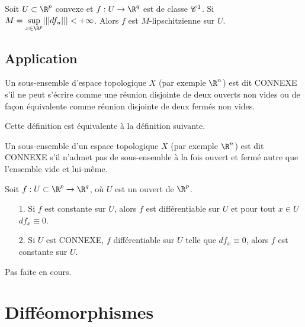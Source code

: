 \documentclass[class=report,crop=false]{standalone}
\begin{document}
\begin{corollaire}
\textcolor[rgb]{0.44,0.00,0.87}{
  Soit $U \subset \R^p$ convexe et $f:U \rightarrow \R^q$ est de classe $\mathscr{C}^1$. Si
$M=\underset{x\in \R^p}{\sup} |||df_u |||<+ \infty$. Alors $f$ est $M$-lipschitzienne sur $U$.}
\end{corollaire}
\section{Application}

\begin{definition}
\textcolor[rgb]{0.98,0.00,0.00}{
  Un sous-ensemble d'espace topologique $X$ (par exemple $\R^n$) est dit CONNEXE s'il ne peut s'\'ecrire comme une r\'eunion disjointe de deux ouverts non vides ou de façon équivalente comme réunion disjointe de deux fermés non vides.}
\end{definition}
\noindent Cette d\'efinition est \'equivalente \`a la d\'efinition suivante.

\begin{definition}
\textcolor[rgb]{0.98,0.00,0.00}{
  Un sous-ensemble d'un espace topologique $X$ (par exemple $\R^n$) est dit CONNEXE s'il n'admet pas de sous-ensemble \`a la fois ouvert et ferm\'e autre que l'ensemble vide et lui-m\^eme.}
\end{definition}

\begin{theoreme}
\textcolor[rgb]{0.44,0.00,0.87}{
  Soit $f: U \subset \R^p \rightarrow \R^q$, o\`u $U$ est un ouvert de $\R^p$.
\begin{itemize}
  \item[1.] Si $f$ est constante sur $U$, alors $f$ est diff\'erentiable sur $U$ et pour tout $x \in U$ $df_x\equiv0$.
  \item[2.] Si $U$ est CONNEXE, $f$ diff\'erentiable sur $U$ telle que $df_x\equiv 0$, alors $f$ est constante sur $U$.
\end{itemize}}
\end{theoreme}
 Pas faite en cours.





\chapter{Diff\'eomorphismes}
\end{document}
